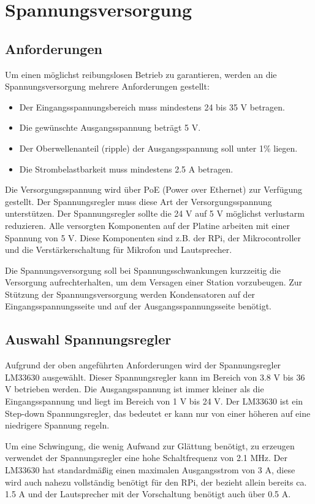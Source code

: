 \section{Spannungsversorgung}
\subsection{Anforderungen}
Um einen möglichst reibungslosen Betrieb zu garantieren, werden an die Spannungsversorgung mehrere Anforderungen gestellt:
\begin{itemize}
	\item Der Eingangsspannungsbereich muss mindestens 24 bis 35 V betragen.
	\item Die gewünschte Ausgangsspannung beträgt 5 V.
	\item Der Oberwellenanteil (ripple) der Ausgangsspannung soll unter 1\% liegen. 
	\item Die Strombelastbarkeit muss mindestens 2.5 A betragen.
\end{itemize}
Die Versorgungsspannung wird über PoE (Power over Ethernet) zur Verfügung gestellt.
Der Spannungsregler muss diese Art der Versorgungsspannung unterstützen.
Der Spannungsregler sollte die 24 V auf 5 V möglichst verlustarm reduzieren.
Alle versorgten Komponenten auf der Platine arbeiten mit einer Spannung von 5 V.
Diese Komponenten sind z.B. der RPi, der Mikrocontroller und die Verstärkerschaltung für Mikrofon und Lautsprecher.\par

Die Spannungsversorgung soll bei Spannungsschwankungen kurzzeitig die Versorgung aufrechterhalten, um dem Versagen einer Station vorzubeugen.
Zur Stützung der Spannungsversorgung werden Kondensatoren auf der Eingangsspannungsseite und auf der Ausgangsspannungsseite benötigt.

\subsection{Auswahl Spannungsregler}
Aufgrund der oben angeführten Anforderungen wird der Spannungsregler LM33630 ausgewählt.
Dieser Spannungsregler kann im Bereich von 3.8 V bis 36 V betrieben werden.
Die Ausgangsspannung ist immer kleiner als die Eingangsspannung und liegt im Bereich von 1 V bis 24 V.
Der LM33630 ist ein Step-down Spannungsregler, das bedeutet er kann nur von einer höheren auf eine niedrigere Spannung regeln.\par

Um eine Schwingung, die wenig Aufwand zur Glättung benötigt, zu erzeugen verwendet der Spannungsregler eine hohe Schaltfrequenz von 2.1 MHz.
Der LM33630 hat standardmäßig einen maximalen Ausgangsstrom von 3 A, diese wird auch nahezu vollständig benötigt für den RPi, der bezieht allein bereits ca. 1.5 A und der Lautsprecher mit der Vorschaltung benötigt auch über 0.5 A.\par

